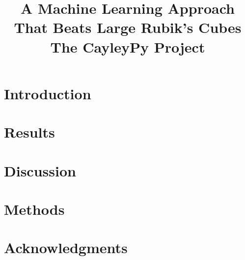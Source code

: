 \documentclass[reprint, amsmath,amssymb, aps, pra]{revtex4-2}
\begin{document}
\title{
    \texorpdfstring{
        A Machine Learning Approach That Beats Large Rubik's Cubes
        \\ \small{The CayleyPy Project}
    }{
        A Machine Learning Approach That Beats Large Rubik's Cubes
    }
}






\maketitle


\section{\label{intro}Introduction}



\section{\label{sec_results}Results}






\section{\label{sec_discussion}Discussion}



\section{\label{sec_methods} Methods}









\section{Acknowledgments}







\end{document}
